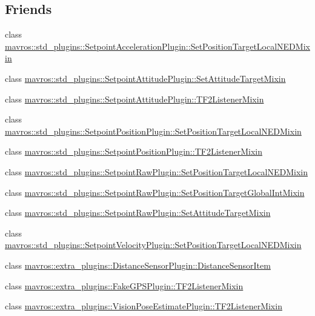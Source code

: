 \subsection*{Friends}
\begin{DoxyCompactItemize}
\item 
class \mbox{\hyperlink{group__plugin_gac6cc7d4f0f89ffc59d03574a47983861}{mavros\+::std\+\_\+plugins\+::\+Setpoint\+Acceleration\+Plugin\+::\+Set\+Position\+Target\+Local\+N\+E\+D\+Mixin}}
\item 
class \mbox{\hyperlink{group__plugin_ga1d68f99fc6ccc3d89d32bd54885749f7}{mavros\+::std\+\_\+plugins\+::\+Setpoint\+Attitude\+Plugin\+::\+Set\+Attitude\+Target\+Mixin}}
\item 
class \mbox{\hyperlink{group__plugin_ga0eb3bbd8737231d2db969230d1d8b54b}{mavros\+::std\+\_\+plugins\+::\+Setpoint\+Attitude\+Plugin\+::\+T\+F2\+Listener\+Mixin}}
\item 
class \mbox{\hyperlink{group__plugin_gac6cc7d4f0f89ffc59d03574a47983861}{mavros\+::std\+\_\+plugins\+::\+Setpoint\+Position\+Plugin\+::\+Set\+Position\+Target\+Local\+N\+E\+D\+Mixin}}
\item 
class \mbox{\hyperlink{group__plugin_ga0eb3bbd8737231d2db969230d1d8b54b}{mavros\+::std\+\_\+plugins\+::\+Setpoint\+Position\+Plugin\+::\+T\+F2\+Listener\+Mixin}}
\item 
class \mbox{\hyperlink{group__plugin_gac6cc7d4f0f89ffc59d03574a47983861}{mavros\+::std\+\_\+plugins\+::\+Setpoint\+Raw\+Plugin\+::\+Set\+Position\+Target\+Local\+N\+E\+D\+Mixin}}
\item 
class \mbox{\hyperlink{group__plugin_gab083ddfdc076ca82665c4059a112494d}{mavros\+::std\+\_\+plugins\+::\+Setpoint\+Raw\+Plugin\+::\+Set\+Position\+Target\+Global\+Int\+Mixin}}
\item 
class \mbox{\hyperlink{group__plugin_ga1d68f99fc6ccc3d89d32bd54885749f7}{mavros\+::std\+\_\+plugins\+::\+Setpoint\+Raw\+Plugin\+::\+Set\+Attitude\+Target\+Mixin}}
\item 
class \mbox{\hyperlink{group__plugin_gac6cc7d4f0f89ffc59d03574a47983861}{mavros\+::std\+\_\+plugins\+::\+Setpoint\+Velocity\+Plugin\+::\+Set\+Position\+Target\+Local\+N\+E\+D\+Mixin}}
\item 
class \mbox{\hyperlink{group__plugin_ga4926c3f115f5d91d3b0e1bdbffa71d18}{mavros\+::extra\+\_\+plugins\+::\+Distance\+Sensor\+Plugin\+::\+Distance\+Sensor\+Item}}
\item 
class \mbox{\hyperlink{group__plugin_ga0eb3bbd8737231d2db969230d1d8b54b}{mavros\+::extra\+\_\+plugins\+::\+Fake\+G\+P\+S\+Plugin\+::\+T\+F2\+Listener\+Mixin}}
\item 
class \mbox{\hyperlink{group__plugin_ga0eb3bbd8737231d2db969230d1d8b54b}{mavros\+::extra\+\_\+plugins\+::\+Vision\+Pose\+Estimate\+Plugin\+::\+T\+F2\+Listener\+Mixin}}
\end{DoxyCompactItemize}


